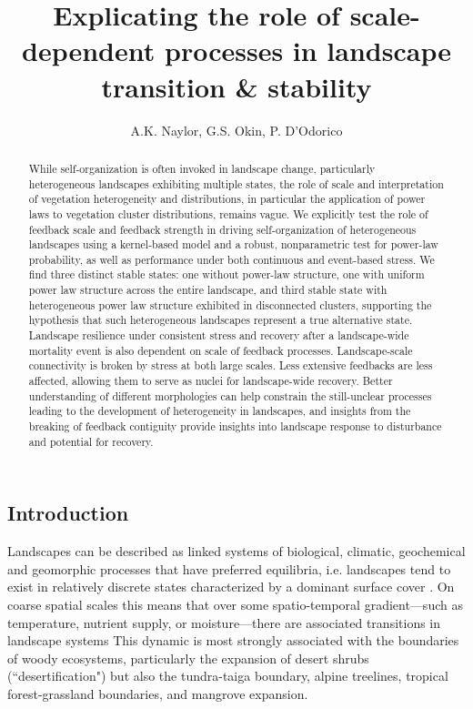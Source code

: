\documentclass[10pt]{article}
\begin{document}
\begin{titlepage}
\title{Explicating the role of scale-dependent processes in landscape transition \& stability}
\author{A.K. Naylor, G.S. Okin, P. D'Odorico}
\maketitle
\end{titlepage}

\begin{linenumbers}
\begin{abstract}
While self-organization is often invoked in landscape change, particularly heterogeneous landscapes exhibiting multiple states, the role of scale and interpretation of vegetation heterogeneity and distributions, in particular the application of power laws to vegetation cluster distributions, remains vague. We explicitly test the role of feedback scale and feedback strength in driving self-organization of heterogeneous landscapes using a kernel-based model and a robust, nonparametric test for power-law probability, as well as performance under both continuous and event-based stress. We find three distinct stable states: one without power-law structure, one with uniform power law structure across the entire landscape, and third stable state with heterogeneous power law structure exhibited in disconnected clusters, supporting the hypothesis that such heterogeneous landscapes represent a true alternative state. Landscape resilience under consistent stress and recovery after a landscape-wide mortality event is also dependent on scale of feedback processes. Landscape-scale connectivity is broken by stress at both large scales. Less extensive feedbacks are less affected, allowing them to serve as nuclei for landscape-wide recovery. Better understanding of different morphologies can help constrain the still-unclear processes leading to the development of heterogeneity in landscapes, and insights from the breaking of feedback contiguity provide insights into landscape response to disturbance and potential for recovery.\end{abstract}

\section{Introduction}

Landscapes can be described as linked systems of biological, climatic, geochemical and geomorphic processes that have preferred equilibria, i.e. landscapes tend to exist in relatively discrete states characterized by a dominant surface cover \citep{Holling1973,Noy-Meir1975,Westoby1989}. On coarse spatial scales this means that over some spatio-temporal gradient---such as temperature, nutrient supply, or moisture---there are associated transitions in landscape systems  This dynamic is most strongly associated with the boundaries of woody ecosystems, particularly the expansion of desert shrubs (``desertification") but also the tundra-taiga boundary, alpine treelines, tropical forest-grassland boundaries, and mangrove expansion.


\end{linenumbers}
\end{document}
